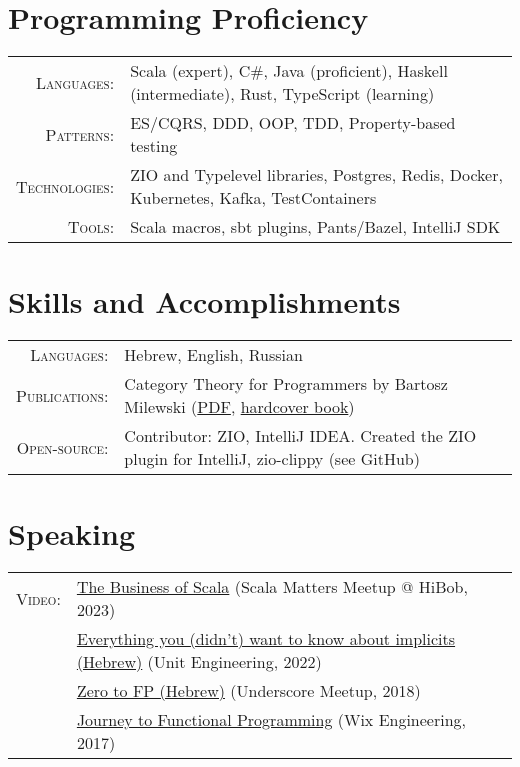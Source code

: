 \documentclass[a4paper,11pt]{article}
\begin{document}
\section{Programming Proficiency}
\begin{tabular}{rl}
  \textsc{Languages:}& Scala (expert), C\#, Java (proficient), Haskell (intermediate), Rust, TypeScript (learning)\\
  \textsc{Patterns:}& ES/CQRS, DDD, OOP, TDD, Property-based testing\\
  \textsc{Technologies:}& ZIO and Typelevel libraries, Postgres, Redis, Docker, Kubernetes, Kafka, TestContainers\\
  \textsc{Tools:}& Scala macros, sbt plugins, Pants/Bazel, IntelliJ SDK\\
\end{tabular}

\section{Skills and Accomplishments}
\begin{tabular}{rl}
  \textsc{Languages:}& Hebrew, English, Russian\\
  \textsc{Publications:}& Category Theory for Programmers by Bartosz Milewski (\href{https://github.com/hmemcpy/milewski-ctfp-pdf}{PDF}, \href{https://www.blurb.com/b/9621951-category-theory-for-programmers-new-edition-hardco}{hardcover book})\\
  \textsc{Open-source:}&Contributor: ZIO, IntelliJ IDEA. Created the ZIO plugin for IntelliJ, zio-clippy (see GitHub)
\end{tabular}

\section{Speaking}
\begin{tabular}{rl}
  \textsc{Video:}&\href{https://www.youtube.com/watch?v=eILoMm9t4rI}{The Business of Scala} (Scala Matters Meetup @ HiBob, 2023)\\
  &\href{https://www.youtube.com/watch?v=qBmZJwmd0CA}{Everything you (didn't) want to know about implicits (Hebrew)} (Unit Engineering, 2022)\\
  &\href{https://www.youtube.com/watch?v=N6ZJwnvTjLA}{Zero to FP (Hebrew)} (Underscore Meetup, 2018)\\
  &\href{https://www.youtube.com/watch?v=g1EvM4CbUvM}{Journey to Functional Programming} (Wix Engineering, 2017)\\
\end{tabular}
\end{document}
